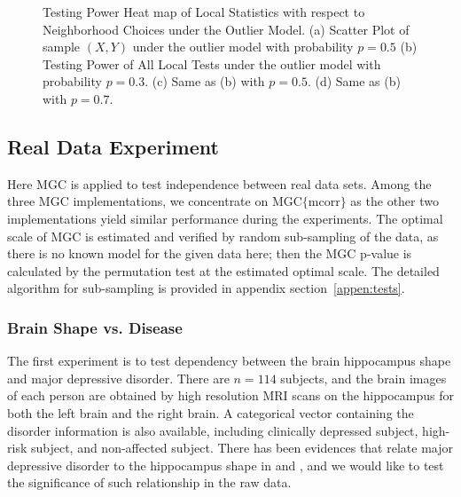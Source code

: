 \documentclass[11pt]{article}
\newcommand{\cs}[1]{{\color{blue}{#1}}}
\begin{document}
\begin{figure}[htbp]
{}
\hfil
{}
\caption{Testing Power Heat map of Local Statistics with respect to Neighborhood Choices under the Outlier Model.
(a) Scatter Plot of sample $(X,Y)$ under the outlier model with probability $p=0.5$
(b) Testing Power of All Local Tests under the outlier model with probability $p=0.3$.
(c) Same as (b) with $p=0.5$.
(d) Same as (b) with $p=0.7$.
}
\label{figSim3}
\end{figure}

\subsection{Real Data Experiment}
\label{numer3}
Here MGC is applied to test independence between real data sets. Among the three MGC implementations, we concentrate on MGC$\{$mcorr$\}$ as the other two implementations yield similar performance during the experiments. The optimal scale of MGC is estimated and verified by random sub-sampling of the data, as there is no known model for the given data here; then the MGC p-value is calculated by the permutation test at the estimated optimal scale. The detailed algorithm for sub-sampling is provided in appendix section~\ref{appen:tests}. 
\cs{tba: update CORR figure and number}

\subsubsection{Brain Shape vs. Disease}

The first experiment is to test dependency between the brain hippocampus shape and major depressive disorder. There are $n=114$ subjects, and the brain images of each person are obtained by high resolution MRI scans on the hippocampus for both the left brain and the right brain. A categorical vector containing the disorder information is also available, including clinically depressed subject, high-risk subject, and non-affected subject. There has been evidences that relate major depressive disorder to the hippocampus shape in \cite{ParkEtAl2011} and \cite{PosenerEtAl2003}, and we would like to test the significance of such relationship in the raw data. 
\end{document}
